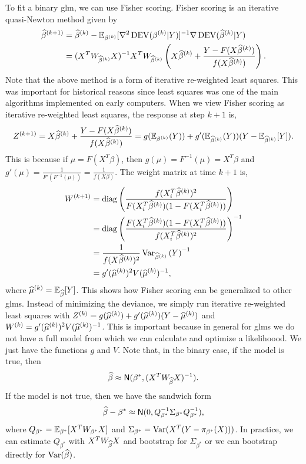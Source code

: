 To fit a binary glm, we can use Fisher scoring. Fisher scoring is an iterative quasi-Newton method given by{
\begin{align*}
    \widehat{\beta}^{(k+1)}& = \widehat{\beta}^{(k)} - {\mathbb{E}}_{\beta^{(k)}}[\nabla^2 \operatorname{DEV}(\beta^{(k)}|Y)]^{-1}\nabla \operatorname{DEV}(\widehat{\beta}^{(k)}|Y) \\
    &= (X^TW_{\widehat{\beta}^{(k)}}X)^{-1}X^TW_{\widehat{\beta}^{(k)}}\left(X\widehat{\beta}^{(k)}+\frac{Y-F(X\widehat{\beta}^{(k)})}{f(X\widehat{\beta}^{(k)})}\right).
\end{align*}
Note that the above method is a form of iterative re-weighted least squares. This was important for historical reasons since least squares was one of the main algorithms implemented on early computers. When we view Fisher scoring as iterative re-weighted least squares, the response at step $k+1$ is,
\[Z^{(k+1)} = X\widehat{\beta}^{(k)} + \frac{Y-F(X\widehat{\beta}^{(k)})}{f(X\widehat{\beta}^{(k)})} = g({\mathbb{E}}_{\beta^{(k)}}(Y)) + g'({\mathbb{E}}_{\widehat{\beta}^{(k)}}(Y))(Y-{\mathbb{E}}_{\widehat{\beta}^{(k)}}[Y]). \]
This is because if $\mu = F(X^T\beta)$, then $g(\mu) = F^{-1}(\mu) = X^T\beta$ and $g'(\mu) = \frac{1}{F'(F^{-1}(\mu))} = \frac{1}{f(X\beta)}$. The weight matrix at time $k+1$ is,
\begin{align*}
    W^{(k+1)} &= \operatorname{diag}\left(\frac{f(X_i^T\widehat{\beta}^{(k)})^2}{F(X_i^T\widehat{\beta}^{(k)})(1-F(X_i^T\widehat{\beta}^{(k)}))}\right)\\
    &=\operatorname{diag}\left(\frac{F(X_i^T\widehat{\beta}^{(k)})(1-F(X_i^T\widehat{\beta}^{(k)}))}{f(X_i^T\widehat{\beta}^{(k)})^2}\right)^{-1}\\
    &=\frac{1}{f(X\widehat{\beta}^{(k)})^2}\operatorname{Var}_{\widehat{\beta}^{(k)}}\left(Y\right)^{-1}\\
    &=g'(\widehat{\mu}^{(k)})^2 V(\widehat{\mu}^{(k)})^{-1},
\end{align*}
where $\widehat{\mu}^{(k)} = {\mathbb{E}}_{\widehat{\beta}}[Y]$. This shows how Fisher scoring can be generalized to other glms. Instead of minimizing the deviance, we simply run iterative re-weighted least squares with $Z^{(k)} = g(\widehat{\mu}^{(k)})+g'(\widehat{\mu}^{(k)})(Y-\widehat{\mu}^{(k)})$ and $W^{(k)} = g'(\widehat{\mu}^{(k)})^2V(\widehat{\mu}^{(k)})^{-1}$. This is important because in general for glms we do not have a full model from which we can calculate and optimize a likelihoood. We just have the functions $g$ and $V$. Note that, in the binary case, if the model is true, then 
\[\widehat{\beta} \approx \mathsf{N}(\beta^*, (X^TW_{\widehat{\beta}}X)^{-1}). \]
If the model is not true, then we have the sandwich form
\[\widehat{\beta}-\beta^* \approx \mathsf{N}(0, Q^{-1}_{\beta^*}\Sigma_{\beta^*}Q^{-1}_{\beta^*}), \]
where $Q_{\beta^*} = {\mathbb{E}}_{\beta^*}[X^TW_{\beta^*}X]$ and $\Sigma_{\beta^*} = \operatorname{Var}(X^T(Y-\pi_{\beta^*}(X)))$. In practice, we can estimate $Q_{\beta^*}$ with $X^TW_{\widehat{\beta}}X$ and bootstrap for $\Sigma_{\beta^*}$ or we can bootstrap directly for $\operatorname{Var}(\widehat{\beta})$. 
}
